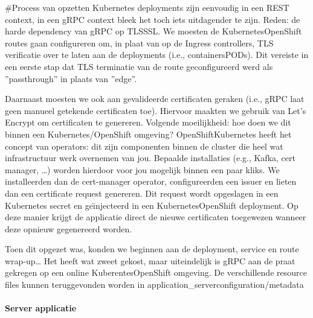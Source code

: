 \#Process van opzetten
Kubernetes deployments zijn eenvoudig in een REST context, in een gRPC context bleek het toch iets uitdagender te zijn. Reden: de harde
dependency van gRPC op TLS\/SSL. We moesten de Kubernetes\/OpenShift routes gaan configureren om, in plaat van op de Ingress controllers, TLS
verificatie over te laten aan de deployments (i.e., containers\/PODs). Dit vereiste in een eerste stap dat TLS terminatie van de route
geconfigureerd werd als ''passthrough'' in plaats van ''edge''.

Daarnaast moesten we ook aan gevalideerde certificaten geraken (i.e., gRPC laat geen manueel getekende certificaten toe). Hiervoor maakten we
gebruik van Let's Encrypt om certificaten te genereren. Volgende moeilijkheid: hoe doen we dit binnen een Kubernetes/OpenShift omgeving?
OpenShift\/Kubernetes heeft het concept van operators: dit zijn componenten binnen de cluster die heel wat infrastructuur werk overnemen van jou.
Bepaalde installaties (e.g., Kafka, cert manager, \ldots) worden hierdoor voor jou mogelijk binnen een paar kliks. We installeerden dan de
cert-manager operator, configureerden een issuer en lieten dan een certificate request genereren. Dit request wordt opgeslagen in een Kubernetes
secret en ge\"{\i}njecteerd in een Kubernetes\/OpenShift deployment. Op deze manier krijgt de applicatie direct de nieuwe certificaten toegewezen
wanneer deze opnieuw gegenereerd worden.

Toen dit opgezet was, konden we beginnen aan de deployment, service en route wrap-up\ldots
Het heeft wat zweet gekost, maar uiteindelijk is gRPC aan de praat gekregen op een online Kuberentes\/OpenShift omgeving.
De verschillende resource files kunnen teruggevonden worden in application\_server\/configuration/metadata

\paragraph{Server applicatie}

